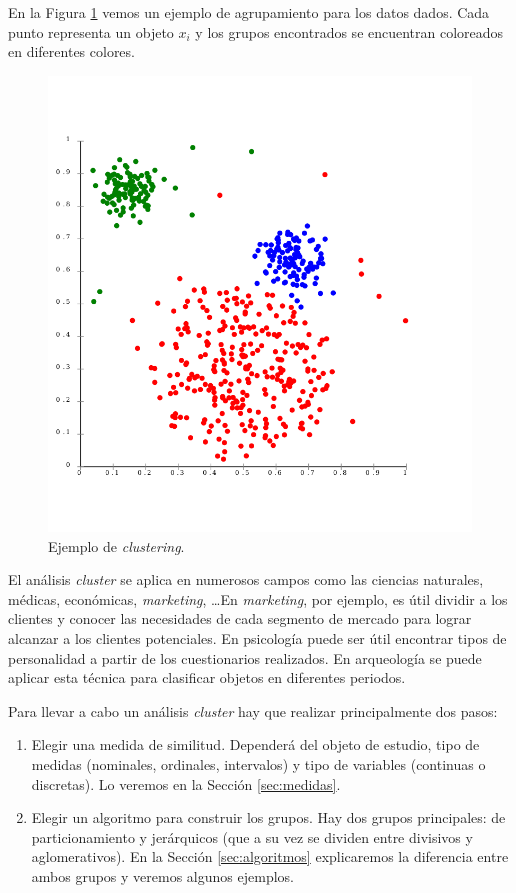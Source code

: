 \documentclass[a4paper, 20pt]{article}
\begin{document}
En la Figura \ref{fig:ejemplo1} vemos un ejemplo de agrupamiento para los datos dados. Cada punto representa un objeto $x_i$ y los grupos encontrados se encuentran coloreados en diferentes colores.

\begin{figure}[H]
	\centering
	\includegraphics[scale=0.3]{ejemplo}
	\caption{Ejemplo de \textit{clustering}. \cite{chire_deutsch:_2011}}
	\label{fig:ejemplo1}
\end{figure}

El análisis \textit{cluster} se aplica en numerosos campos como las ciencias naturales, médicas, económicas, \textit{marketing}, \dots En \textit{marketing}, por ejemplo, es útil dividir a los clientes y conocer las necesidades de cada segmento de mercado para lograr alcanzar a los clientes potenciales. En psicología puede ser útil encontrar tipos de personalidad a partir de los cuestionarios realizados. En arqueología se puede aplicar esta técnica para clasificar objetos en diferentes periodos.

Para llevar a cabo un análisis \textit{cluster} hay que realizar principalmente dos pasos:

\begin{enumerate}
\item Elegir una medida de similitud. Dependerá del objeto de estudio, tipo de medidas (nominales, ordinales, intervalos) y tipo de variables (continuas o discretas). Lo veremos en la Sección \ref{sec:medidas}.
\item Elegir un algoritmo para construir los grupos. Hay dos grupos principales: de particionamiento y jerárquicos (que a su vez se dividen entre divisivos y aglomerativos). En la Sección \ref{sec:algoritmos} explicaremos la diferencia entre ambos grupos y veremos algunos ejemplos.
\end{enumerate}
\end{document}
